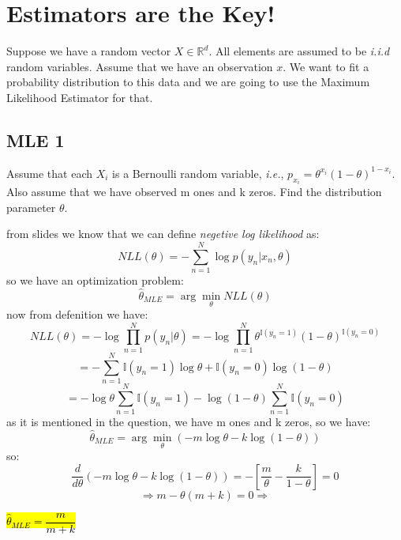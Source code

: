 \section{Estimators are the Key!}
Suppose we have a random vector $X \in \mathbb{R}^d $. All elements are assumed to be \textit{i.i.d} random
variables. Assume that we have an observation $x$. We want to fit a probability distribution to
this data and we are going to use the Maximum Likelihood Estimator for that.
\subsection{MLE 1}
Assume that each $X_i$ is a Bernoulli random variable, \textit{i.e.}, $p_{x_i} = \theta ^ {x_i} (1-\theta)^{1-x_i}$. Also assume that we have observed m ones and k zeros. Find the distribution parameter $\theta$.
\begin{qsolve}
	\begin{qsolve}[]
		from slides we know that we can define \textit{negetive log likelihood} as:
		$$NLL(\theta) = -\sum_{n=1}^{N} \log p(y_n|x_n , \theta)$$
		so we have an optimization problem:
		$$\hat{\theta}_{MLE} = \arg \min_{\theta} NLL(\theta)$$
		now from defenition we have:
		$$NLL(\theta) = -\log \prod_{n=1}^{N} p(y_n|\theta) = -\log \prod_{n=1}^{N} \theta^{\mathbb{I}(y_n=1)}(1-\theta)^{\mathbb{I}(y_n=0)}$$
		$$= -\sum_{n=1}^{N} \mathbb{I}(y_n=1)\log \theta + \mathbb{I}(y_n=0)\log (1-\theta)$$
		$$ = -\log \theta \sum_{n=1}^{N} \mathbb{I}(y_n=1) - \log (1-\theta) \sum_{n=1}^{N} \mathbb{I}(y_n=0)$$
		as it is mentioned in the question, we have m ones and k zeros, so we have:
		$$\hat{\theta}_{MLE} = \arg \min_{\theta} (-m\log \theta - k\log (1-\theta))$$
		so:
		$$\dfrac{d}{d \theta} (-m\log \theta - k\log (1-\theta)) = -[\dfrac{m}{\theta} - \dfrac{k}{1-\theta}] = 0$$
		$$\Rightarrow m - \theta (m+k) = 0 \Rightarrow$$
		\begin{center}
			\hl{$ \hat{\theta}_{MLE} = \dfrac{m}{m+k}$}
		\end{center}
		 
	\end{qsolve}
\end{qsolve}

